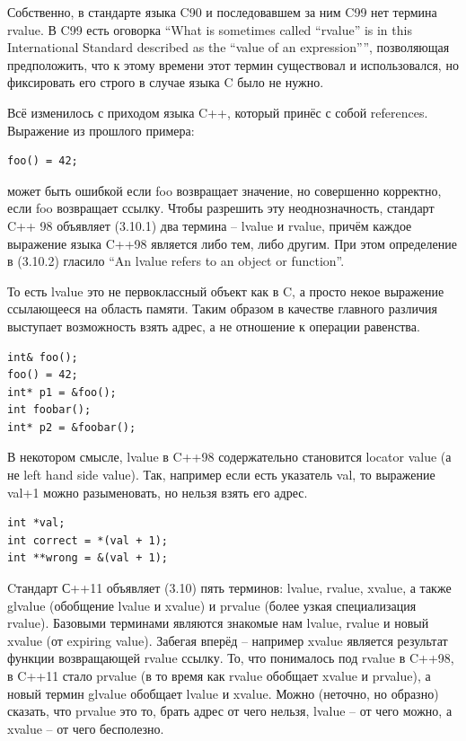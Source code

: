 \documentclass[a4paper,12pt,oneside]{article}
\begin{document}
Собственно, в стандарте языка C90 и последовавшем за ним C99 нет термина rvalue. В C99 есть оговорка ``What is sometimes called ``rvalue'' is in this International Standard described as the ``value of an expression'''', позволяющая предположить, что к этому времени этот термин существовал и использовался, но фиксировать его строго в случае языка C было не нужно.

Всё изменилось с приходом языка C++, который принёс с собой references. Выражение из прошлого примера:

\begin{lstlisting}
foo() = 42;
\end{lstlisting}

может быть ошибкой если foo возвращает значение, но совершенно корректно, если foo возвращает ссылку. Чтобы разрешить эту неоднозначность, стандарт C++ 98 объявляет (3.10.1) два термина -- lvalue и rvalue, причём каждое выражение языка C++98 является либо тем, либо другим. При этом определение в (3.10.2) гласило ``An lvalue refers to an object or function''.

То есть lvalue это не первоклассный объект как в C, а просто некое выражение ссылающееся на область памяти. Таким образом в качестве главного различия выступает возможность взять адрес, а не отношение к операции равенства.

\begin{lstlisting}
int& foo();
foo() = 42;
int* p1 = &foo();
int foobar();
int* p2 = &foobar();
\end{lstlisting}

В некотором смысле, lvalue в C++98 содержательно становится locator value (а не left hand side value). Так, например если есть указатель val, то выражение val+1 можно разыменовать, но нельзя взять его адрес.

\begin{lstlisting}
int *val;
int correct = *(val + 1);
int **wrong = &(val + 1);
\end{lstlisting}

Cтандарт С++11 объявляет (3.10) пять терминов: lvalue, rvalue, xvalue, а также glvalue (обобщение lvalue и xvalue) и prvalue (более узкая специализация rvalue). Базовыми терминами являются знакомые нам lvalue, rvalue и новый xvalue (от expiring value). Забегая вперёд -- например xvalue является результат функции возвращающей rvalue ссылку. То, что понималось под rvalue в C++98, в C++11 стало prvalue (в то время как rvalue обобщает xvalue и prvalue), а новый термин glvalue обобщает lvalue и xvalue. Можно (неточно, но образно) сказать, что prvalue это то, брать адрес от чего нельзя, lvalue -- от чего можно, а xvalue -- от чего бесполезно.
\end{document}
